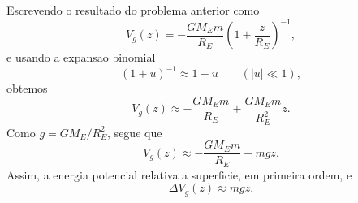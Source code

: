 Escrevendo o resultado do problema anterior como
\[
V_g(z)=-\frac{GM_E m}{R_E}\left(1+\frac{z}{R_E}\right)^{-1},
\]
e usando a expansao binomial
\[
(1+u)^{-1} \approx 1-u \qquad (|u|\ll 1),
\]
obtemos
\[
V_g(z) \approx -\frac{GM_E m}{R_E} + \frac{GM_E m}{R_E^2}z.
\]
Como $g=GM_E/R_E^2$, segue que
\[
V_g(z) \approx -\frac{GM_E m}{R_E} + mgz.
\]
Assim, a energia potencial relativa a superficie, em primeira ordem, e
\[
\Delta V_g(z) \approx mgz.
\]

